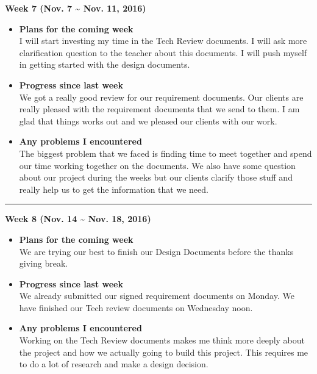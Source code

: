 		\begin{center}
			\textbf{Week 7 (Nov. 7 {\textasciitilde{}} Nov. 11, 2016)}
		\end{center}
		\begin{itemize}
			\item \textbf{Plans for the coming week}
			\\ I will start investing my time in the Tech Review documents. I will ask more clarification question to the teacher about this documents. I will push myself in getting started with the design documents. \\

			\item \textbf{Progress since last week}
			\\We got a really good review for our requirement documents. Our clients are really pleased with the requirement documents that we send to them. I am glad that things works out and we pleased our clients with our work. \\

			\item \textbf{Any problems I encountered}
			\\The biggest problem that we faced is finding time to meet together and spend our time working together on the documents. We also have some question about our project during the weeks but our clients clarify those stuff and really help us to get the information that we need.\\
		\end{itemize}

		\rule{\textwidth}{0.5pt}

		\begin{center}
			\textbf{Week 8 (Nov. 14 {\textasciitilde{}} Nov. 18, 2016)}
		\end{center}
		\begin{itemize}
			\item \textbf{Plans for the coming week}
			\\ We are trying our best to finish our Design Documents before the thanks giving break. \\

			\item \textbf{Progress since last week}
			\\We already submitted our signed requirement documents on Monday. We have finished our Tech review documents on Wednesday noon. \\

			\item \textbf{Any problems I encountered}
			\\Working on the Tech Review documents makes me think more deeply about the project and how we actually going to build this project. This requires me to do a lot of research and make a design decision.\\
		\end{itemize}

